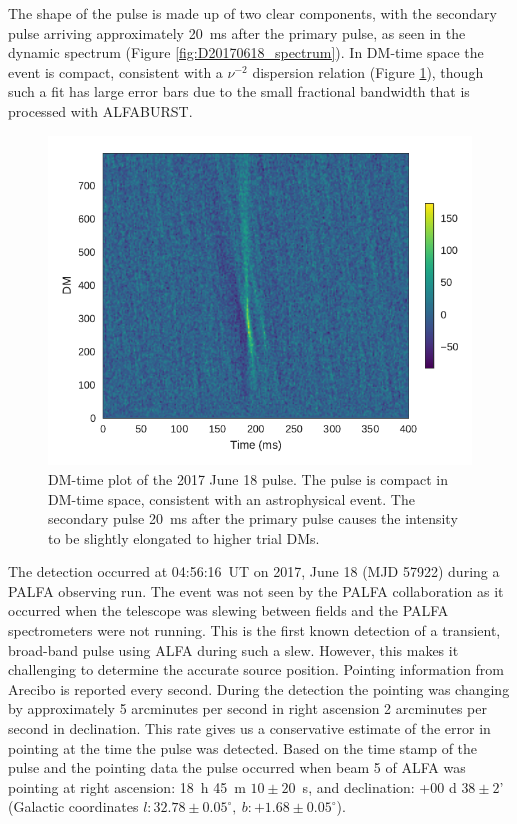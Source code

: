 \documentclass[a4paper,fleqn,usenatbib]{mnras}
\begin{document}
The shape of the pulse is made up of two clear components, with the secondary
pulse arriving approximately 20~ms after the primary pulse, as seen in the
dynamic spectrum (Figure \ref{fig:D20170618_spectrum}). In DM-time space the
event is compact, consistent with a $\nu^{-2}$ dispersion relation (Figure
\ref{fig:D20170618_dmspace}), though such a fit has large error bars due to the
small fractional bandwidth that is processed with ALFABURST.

\begin{figure}
    \includegraphics[width=1.0\linewidth]{figures/Beam5_fb_D20170618T005616_buffer2_dmspace.pdf}
    \caption{DM-time plot of the 2017 June 18 pulse. The pulse is compact in
    DM-time space, consistent with an astrophysical event. The secondary pulse
    20~ms after the primary pulse causes the intensity to be slightly elongated
    to higher trial DMs.
    }
    \label{fig:D20170618_dmspace}
\end{figure}

The detection occurred at 04:56:16~UT on 2017, June 18 (MJD 57922) during a
PALFA observing run. The event was not seen by the PALFA collaboration as it
occurred when the telescope was slewing between fields and the PALFA
spectrometers were not running. This is the first known detection of a
transient, broad-band pulse using ALFA during such a slew. However, this makes
it challenging to determine the accurate source position. Pointing information
from Arecibo is reported every second.  During the detection the pointing was
changing by approximately 5 arcminutes per second in right ascension 2
arcminutes per second in declination. This rate gives us a conservative estimate
of the error in pointing at the time the pulse was detected. Based on the time
stamp of the pulse and the pointing data the pulse occurred when beam 5 of ALFA
was pointing at right ascension: 18~h 45~m $10 \pm 20$~s, and declination: +00 d
$38 \pm 2$' (Galactic coordinates $l: 32.78 \pm 0.05^{\circ}, ~b: +1.68 \pm
0.05^{\circ}$).
\end{document}
